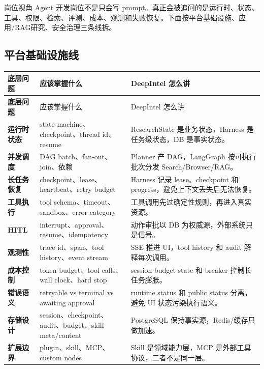 \begin{summaryBox}{岗位视角}
Agent 开发岗位不是只会写 prompt。真正会被追问的是运行时、状态、工具、权限、检索、评测、成本、观测和失败恢复。下面按平台基础设施、应用/RAG研究、安全治理三条线拆。
\end{summaryBox}

\subsection{平台基础设施线}
\begin{longtable}{>{\bfseries}p{}p{}p{}}
\toprule
底层问题 & 应该掌握什么 & DeepIntel 怎么讲 \\
\midrule
\endfirsthead
\toprule
底层问题 & 应该掌握什么 & DeepIntel 怎么讲 \\
\midrule
\endhead
运行时状态 & state machine、checkpoint、thread id、resume & ResearchState 是业务状态，Harness 是任务级状态，DB 是事实状态。 \\
并发调度 & DAG batch、fan-out、join、依赖 & Planner 产 DAG，LangGraph 按可执行批次分发 Search/Browser/RAG。 \\
长任务恢复 & checkpoint、lease、heartbeat、retry budget & Harness 记录 lease、checkpoint 和 progress，避免上下文丢失后无法恢复。 \\
工具执行 & tool schema、timeout、sandbox、error category & 工具调用先过确定性规则，再进入真实资源。 \\
HITL & interrupt、approval、resume、idempotency & 动作审批以 DB 为权威源，外部系统只是信号。 \\
观测性 & trace id、span、tool history、event stream & SSE 推进 UI，tool history 和 audit 解释每次调用。 \\
成本控制 & token budget、tool calls、wall clock、hard stop & session budget state 和 breaker 控制长任务膨胀。 \\
错误语义 & retryable vs terminal vs awaiting approval & runtime status 和 public status 分离，避免 UI 状态污染执行语义。 \\
存储设计 & session、checkpoint、audit、budget、skill meta/content & PostgreSQL 保持事实源，Redis/缓存只做加速。 \\
扩展边界 & plugin、skill、MCP、custom nodes & Skill 是领域能力层，MCP 是外部工具协议，二者不是同一层。 \\
\bottomrule
\end{longtable}

